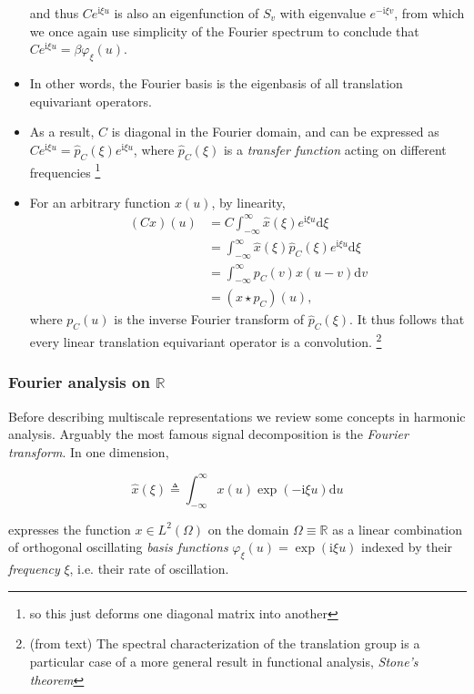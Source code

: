 \documentclass[12pt]{article}
\numberwithin{equation}{section}
\theoremstyle{definition}
\newcommand{		\rmi		}	{	\textrm{i}					}
\newcommand{		\1		}	{	\bm{1}					}%
\begin{document}
\begin{itemize}
$$$$
and thus $Ce^{\rmi \xi u}$ is also an eigenfunction of $S_v$ with eigenvalue $e^{-\rmi \xi v}$, from which we once again use simplicity of the Fourier spectrum to conclude that $Ce^{\rmi \xi u } = \beta \varphi_\xi (u)$.
\item In other words, the Fourier basis is the eigenbasis of all translation equivariant operators. 
\item As a result, $C$ is diagonal in the Fourier domain, and can be expressed as $Ce^{\rmi \xi u} = \hat{p}_C (\xi) e^{\rmi \xi u}$, where $\hat{p}_C(\xi)$ is a \emph{transfer function} acting on different frequencies \footnote{so this just deforms one diagonal matrix into another} 
\item For an arbitrary function $x(u)$, by linearity,
\begin{align*}
(Cx) (u) &= C \int_{-\infty}^\infty \hat{x} (\xi) e^{\rmi \xi u} \textrm{d} \xi \\
&= \int_{-\infty}^\infty \hat{x}(\xi) \hat{p}_C(\xi) e^{\rmi \xi u} \textrm{d} \xi \\
&= \int_{-\infty}^\infty p_C(v) x(u - v) \textrm{d} v \\
&= ( x \star p_C) (u) ,
\end{align*}
where $p_C(u)$ is the inverse Fourier transform of $\hat{p}_C(\xi)$. It thus follows that every linear translation equivariant operator is a convolution. \footnote{(from text) The spectral characterization of the translation group is a particular case of a more general result in functional analysis, \emph{Stone's theorem}}
\end{itemize}





\subsubsection*{Fourier analysis on $\mathbb{R}$} 


Before describing multiscale representations we review some concepts in harmonic analysis. Arguably the most famous signal decomposition is the \emph{Fourier transform}. In one dimension, 

    $$
    \hat{x} (\xi ) \triangleq \int_{-\infty}^\infty x(u) \exp ( - \textrm{i} \xi u ) \textrm{d} u 
    $$
    
    expresses the function $x \in L^2(\Omega)$ on the domain $\Omega \equiv \mathbb{R}$ as a linear combination of orthogonal oscillating \emph{basis functions} $\varphi_\xi(u) = \exp ( \textrm{i} \xi u ) $ indexed by their \emph{frequency} $\xi$, i.e. their rate of oscillation. 
\end{document}
